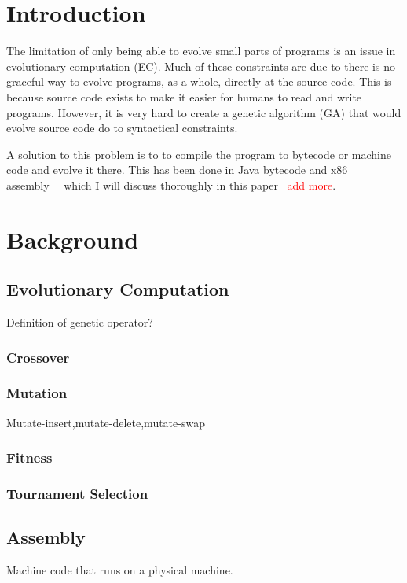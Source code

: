 \documentclass{sig-alternate}
\newcommand{\mycomment}[1]{\textcolor{red}{#1}}
\begin{document}
\terms{}

\keywords{}

\section{Introduction}
	The limitation of only being able to evolve small parts of programs is an issue in evolutionary computation (EC). Much of these constraints are due to there is no graceful way to evolve programs, as a whole, directly at the source code. This is because source code exists to make it easier for humans to read and write programs. However, it is very hard to create a genetic algorithm (GA) that would evolve source code do to syntactical constraints.\par
	A solution to this problem is to to compile the program to bytecode or machine code and evolve it there. This has been done in Java bytecode and x86 assembly~\cite{FINCH:2011}~\cite{Assembly:2010} which I will discuss thoroughly in this paper ~\mycomment{add more}.
	

	
	

\section{Background}

\subsection{Evolutionary Computation}
Definition of genetic operator?

\subsubsection{Crossover}
\subsubsection{Mutation}
Mutate-insert,mutate-delete,mutate-swap
\subsubsection{Fitness}
\subsubsection{Tournament Selection}



\subsection{Assembly}
Machine code that runs on a physical machine.
\end{document}
